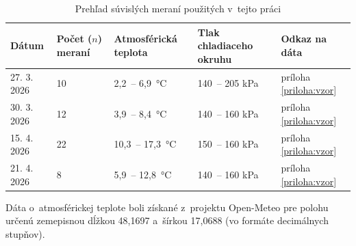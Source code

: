 \documentclass[11pt]{article}
\begin{document}
\begin{table}[H]
    \centering
    \begin{threeparttable}
        \centering
        \caption{Prehľad súvislých meraní použitých v~tejto práci}
        \label{tab:prehlad}
        \begin{tabular}{p{2cm} p{1.6cm} p{2.4cm} p{2.9cm} p{1.7cm}}
            \hline
            Dátum & Počet ($n$) meraní & Atmosférická teplota\tnote{a} & Tlak chladiaceho okruhu & Odkaz na dáta \\ \hline
            27. 3. 2026 & 10 & 2,2~-- 6,9~°C & 140~-- 205 kPa & príloha \ref{priloha:vzor}\\
            30. 3. 2026 & 12 & 3,9~-- 8,4~°C & 140~-- 160 kPa & príloha \ref{priloha:vzor}\\
            15. 4. 2026 & 22 & 10,3~-- 17,3~°C & 150~-- 160 kPa & príloha \ref{priloha:vzor}\\
            21. 4. 2026 & 8 & 5,9~-- 12,8~°C & 140~-- 160 kPa & príloha \ref{priloha:vzor}\\
            \hline
        \end{tabular}
        \begin{tablenotes}
            \small
            \item [a] Dáta o~atmosférickej teplote boli získané z~projektu Open-Meteo pre polohu určenú zemepisnou dĺžkou 48,1697 a~šírkou 17,0688 (vo formáte decimálnych stupňov).
        \end{tablenotes}
  \end{threeparttable}
\end{table}
\end{document}
